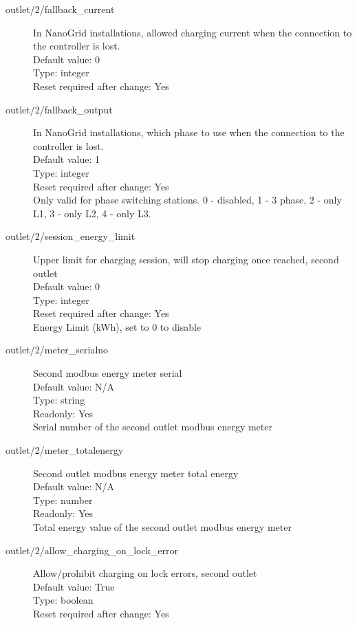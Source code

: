 \begin{description}
\item[outlet/2/fallback\_current] In NanoGrid installations, allowed charging current when the connection to the controller is lost.\\
  Default value: 0\\
  Type: integer\\
  Reset required after change: Yes\\

\item[outlet/2/fallback\_output] In NanoGrid installations, which phase to use when the connection to the controller is lost.\\
  Default value: 1\\
  Type: integer\\
  Reset required after change: Yes\\
  Only valid for phase switching stations. 0 - disabled, 1 - 3 phase, 2 - only L1, 3 - only L2, 4 - only L3.\\

\item[outlet/2/session\_energy\_limit] Upper limit for charging session, will stop charging once reached, second outlet\\
  Default value: 0\\
  Type: integer\\
  Reset required after change: Yes\\
  Energy Limit (kWh), set to 0 to disable\\

\item[outlet/2/meter\_serialno] Second modbus energy meter serial\\
  Default value: N/A\\
  Type: string\\
  Readonly: Yes\\
  Serial number of the second outlet modbus energy meter\\

\item[outlet/2/meter\_totalenergy] Second outlet modbus energy meter total energy\\
  Default value: N/A\\
  Type: number\\
  Readonly: Yes\\
  Total energy value of the second outlet modbus energy meter\\

\item[outlet/2/allow\_charging\_on\_lock\_error] Allow/prohibit charging on lock errors, second outlet\\
  Default value: True\\
  Type: boolean\\
  Reset required after change: Yes\\


\end{description}
